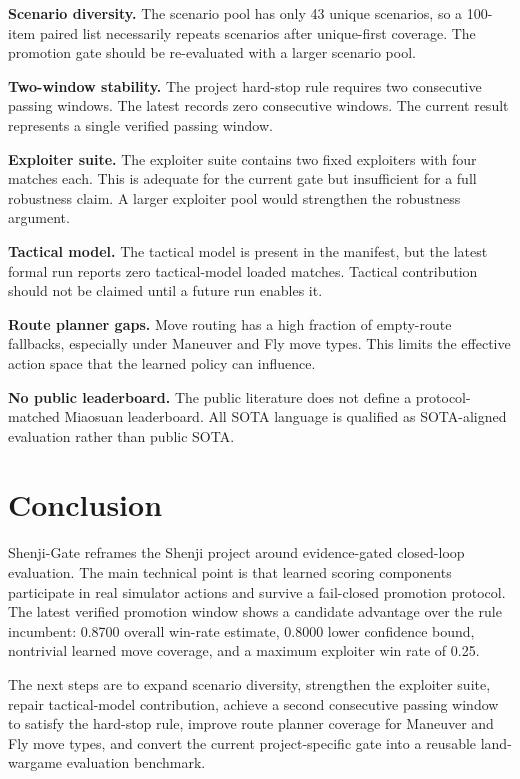\documentclass{article}
\newcommand{\method}{Shenji-Gate}
\begin{document}
\textbf{Scenario diversity.} The scenario pool has only 43 unique scenarios, so a 100-item paired list necessarily repeats scenarios after unique-first coverage. The promotion gate should be re-evaluated with a larger scenario pool.

\textbf{Two-window stability.} The project hard-stop rule requires two consecutive passing windows. The latest  records zero consecutive windows. The current result represents a single verified passing window.

\textbf{Exploiter suite.} The exploiter suite contains two fixed exploiters with four matches each. This is adequate for the current gate but insufficient for a full robustness claim. A larger exploiter pool would strengthen the robustness argument.

\textbf{Tactical model.} The tactical model is present in the manifest, but the latest formal run reports zero tactical-model loaded matches. Tactical contribution should not be claimed until a future run enables it.

\textbf{Route planner gaps.} Move routing has a high fraction of empty-route fallbacks, especially under Maneuver and Fly move types. This limits the effective action space that the learned policy can influence.

\textbf{No public leaderboard.} The public literature does not define a protocol-matched Miaosuan leaderboard. All SOTA language is qualified as SOTA-aligned evaluation rather than public SOTA.

\section{Conclusion}

\method{} reframes the Shenji project around evidence-gated closed-loop evaluation. The main technical point is that learned scoring components participate in real simulator actions and survive a fail-closed promotion protocol. The latest verified promotion window shows a candidate advantage over the rule incumbent: 0.8700 overall win-rate estimate, 0.8000 lower confidence bound, nontrivial learned move coverage, and a maximum exploiter win rate of 0.25.

The next steps are to expand scenario diversity, strengthen the exploiter suite, repair tactical-model contribution, achieve a second consecutive passing window to satisfy the hard-stop rule, improve route planner coverage for Maneuver and Fly move types, and convert the current project-specific gate into a reusable land-wargame evaluation benchmark.
\end{document}
